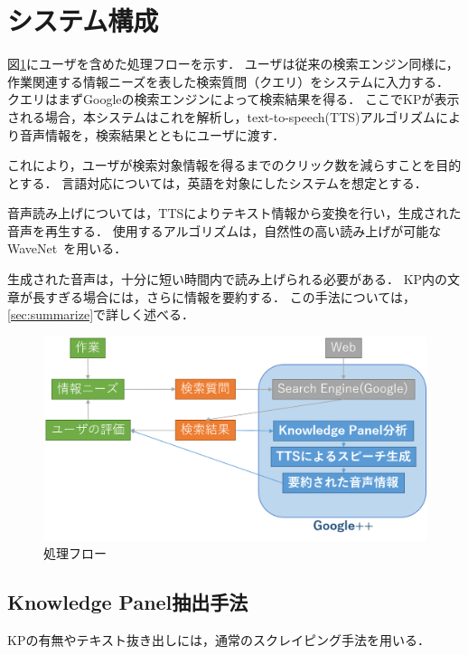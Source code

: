 \documentclass[pdflatex,ja=standard]{bxjsarticle}
\begin{document}
\section{システム構成}

図\ref{fig:system}にユーザを含めた処理フローを示す．
ユーザは従来の検索エンジン同様に，作業関連する情報ニーズを表した検索質問（クエリ）をシステムに入力する．
クエリはまずGoogleの検索エンジンによって検索結果を得る．
ここでKPが表示される場合，本システムはこれを解析し，text-to-speech(TTS)アルゴリズムにより音声情報を，検索結果とともにユーザに渡す．

これにより，ユーザが検索対象情報を得るまでのクリック数を減らすことを目的とする．
言語対応については，英語を対象にしたシステムを想定とする．

音声読み上げについては，TTSによりテキスト情報から変換を行い，生成された音声を再生する．
使用するアルゴリズムは，自然性の高い読み上げが可能なWaveNet~\cite{Oord2016}を用いる．

生成された音声は，十分に短い時間内で読み上げられる必要がある．
KP内の文章が長すぎる場合には，さらに情報を要約する．
この手法については，\ref{sec:summarize}で詳しく述べる．

\begin{figure}[htb]
\begin{center}
    \includegraphics[width=14cm]{figs/system.png}
\end{center}
\caption{処理フロー}
\label{fig:system}
\end{figure}

\subsection{Knowledge Panel抽出手法}

KPの有無やテキスト抜き出しには，通常のスクレイピング手法を用いる．
\end{document}
